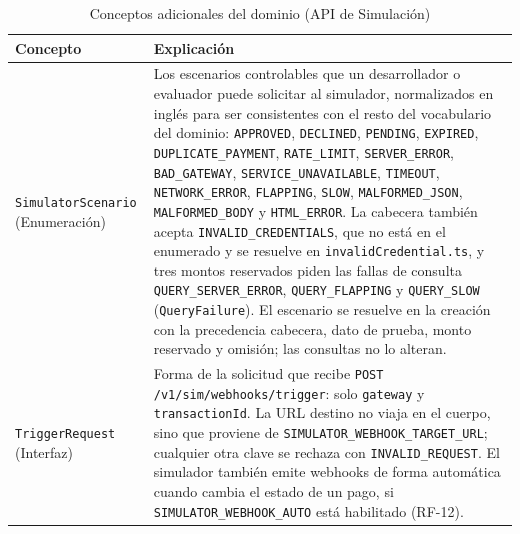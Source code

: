\begin{table}[htbp]
\centering
\caption{Conceptos adicionales del dominio (API de Simulación)}
\label{tab:domain_concepts_API}
\renewcommand{\arraystretch}{1.3}
\begin{tabularx}{\textwidth}{|l|X|}
\hline
\textbf{Concepto} & \textbf{Explicación} \\ \hline
\texttt{SimulatorScenario} (Enumeración) & Los escenarios controlables que un desarrollador o evaluador puede solicitar al simulador, normalizados en inglés para ser consistentes con el resto del vocabulario del dominio: \texttt{APPROVED}, \texttt{DECLINED}, \texttt{PENDING}, \texttt{EXPIRED}, \texttt{DUPLICATE\_PAYMENT}, \texttt{RATE\_LIMIT}, \texttt{SERVER\_ERROR}, \texttt{BAD\_GATEWAY}, \texttt{SERVICE\_UNAVAILABLE}, \texttt{TIMEOUT}, \texttt{NETWORK\_ERROR}, \texttt{FLAPPING}, \texttt{SLOW}, \texttt{MALFORMED\_JSON}, \texttt{MALFORMED\_BODY} y \texttt{HTML\_ERROR}. La cabecera también acepta \texttt{INVALID\_CREDENTIALS}, que no está en el enumerado y se resuelve en \texttt{invalidCredential.ts}, y tres montos reservados piden las fallas de consulta \texttt{QUERY\_SERVER\_ERROR}, \texttt{QUERY\_FLAPPING} y \texttt{QUERY\_SLOW} (\texttt{QueryFailure}). El escenario se resuelve en la creación con la precedencia cabecera, dato de prueba, monto reservado y omisión; las consultas no lo alteran. \\ \hline
\texttt{TriggerRequest} (Interfaz) & Forma de la solicitud que recibe \texttt{POST /v1/sim/webhooks/trigger}: solo \texttt{gateway} y \texttt{transactionId}. La URL destino no viaja en el cuerpo, sino que proviene de \texttt{SIMULATOR\_WEBHOOK\_TARGET\_URL}; cualquier otra clave se rechaza con \texttt{INVALID\_REQUEST}. El simulador también emite webhooks de forma automática cuando cambia el estado de un pago, si \texttt{SIMULATOR\_WEBHOOK\_AUTO} está habilitado (RF-12). \\ \hline
\end{tabularx}
\end{table}


